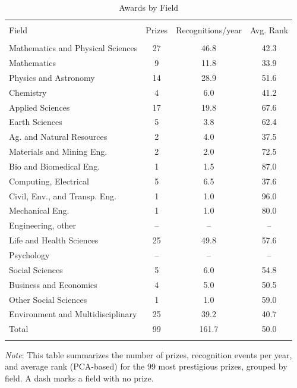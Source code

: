
\begin{table}[!htbp] \centering 
  \caption{Awards by Field} 
  \label{byField} 
\begin{tabular}{@{\extracolsep{5pt}} lccc} 
\\[-1.8ex]\hline 
\hline \\[-1.8ex] 
Field & Prizes & Recognitions/year & Avg. Rank \\ 
\hline \\[-1.8ex] 
Mathematics and Physical Sciences & 27 & 46.8 & 42.3 \\ 
\hspace{3mm} Mathematics & 9 & 11.8 & 33.9 \\ 
\hspace{3mm} Physics and Astronomy & 14 & 28.9 & 51.6 \\ 
\hspace{3mm} Chemistry & 4 & 6.0 & 41.2 \\ 
Applied Sciences & 17 & 19.8 & 67.6 \\ 
\hspace{3mm} Earth Sciences & 5 & 3.8 & 62.4 \\ 
\hspace{3mm} Ag. and Natural Resources & 2 & 4.0 & 37.5 \\ 
\hspace{3mm} Materials and Mining Eng. & 2 & 2.0 & 72.5 \\ 
\hspace{3mm} Bio and Biomedical Eng. & 1 & 1.5 & 87.0 \\ 
\hspace{3mm} Computing, Electrical & 5 & 6.5 & 37.6 \\ 
\hspace{3mm} Civil, Env., and Transp. Eng. & 1 & 1.0 & 96.0 \\ 
\hspace{3mm} Mechanical Eng. & 1 & 1.0 & 80.0 \\ 
\hspace{3mm} Engineering, other & -- & -- & -- \\ 
Life and Health Sciences & 25 & 49.8 & 57.6 \\ 
Psychology & -- & -- & -- \\ 
Social Sciences & 5 & 6.0 & 54.8 \\ 
\hspace{3mm} Business and Economics & 4 & 5.0 & 50.5 \\ 
\hspace{3mm} Other Social Sciences & 1 & 1.0 & 59.0 \\ 
Environment and Multidisciplinary & 25 & 39.2 & 40.7 \\ 
\hline Total & 99 & 161.7 & 50.0 \\ 
\hline \\[-1.8ex] 
\end{tabular} 
\noindent \justify \footnotesize \textit{Note}: This table summarizes the number of prizes, recognition events per year, and average rank (PCA-based) for the 99 most prestigious prizes, grouped by field. A dash marks a field with no prize.
\end{table} 
